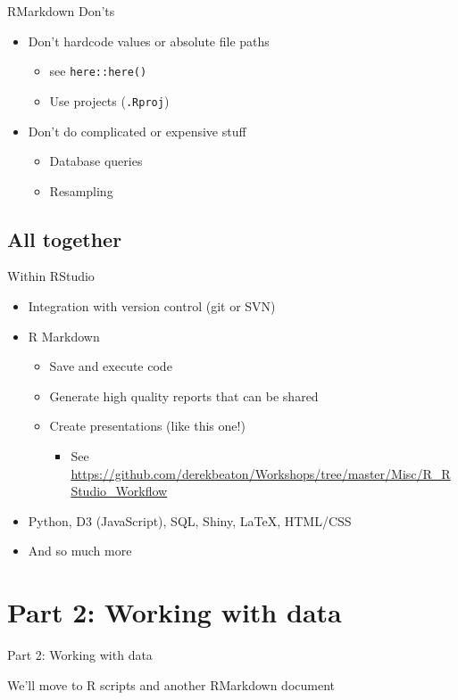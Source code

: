 \documentclass[
  ignorenonframetext,
]{beamer}
\providecommand{\tightlist}{%
  \setlength{\itemsep}{0pt}\setlength{\parskip}{0pt}}
\begin{document}
\begin{frame}[fragile]{RMarkdown Don'ts}
\protect\hypertarget{rmarkdown-donts}{}

\begin{itemize}[<+->]
\tightlist
\item
  Don't hardcode values or absolute file paths

  \begin{itemize}[<+->]
  \tightlist
  \item
    see \texttt{here::here()}
  \item
    Use projects (\texttt{.Rproj})
  \end{itemize}
\item
  Don't do complicated or expensive stuff

  \begin{itemize}[<+->]
  \tightlist
  \item
    Database queries
  \item
    Resampling
  \end{itemize}
\end{itemize}

\end{frame}

\hypertarget{all-together}{%
\subsection{All together}\label{all-together}}

\begin{frame}{Within RStudio}
\protect\hypertarget{within-rstudio}{}

\begin{itemize}[<+->]
\tightlist
\item
  Integration with version control (git or SVN)
\item
  R Markdown

  \begin{itemize}[<+->]
  \tightlist
  \item
    Save and execute code
  \item
    Generate high quality reports that can be shared
  \item
    Create presentations (like this one!)

    \begin{itemize}[<+->]
    \tightlist
    \item
      See
      \url{https://github.com/derekbeaton/Workshops/tree/master/Misc/R_RStudio_Workflow}
    \end{itemize}
  \end{itemize}
\item
  Python, D3 (JavaScript), SQL, Shiny, LaTeX, HTML/CSS
\item
  And so much more
\end{itemize}

\end{frame}

\hypertarget{part-2-working-with-data}{%
\section{Part 2: Working with data}\label{part-2-working-with-data}}

\begin{frame}{Part 2: Working with data}

We'll move to R scripts and another RMarkdown document

\end{frame}
\end{document}
